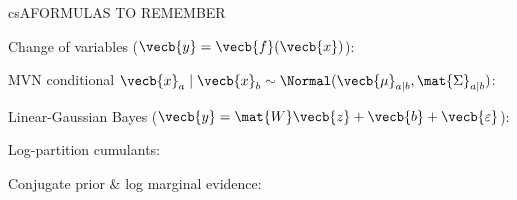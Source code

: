 \documentclass[../../../../master.tex]{subfiles}
\begin{document}
\begin{cscolumns}
\begin{cscard}{csA}{FORMULAS TO REMEMBER}
  \begin{csbul}
    \item Change of variables ($\vecb{y}=\vecb{f}(\vecb{x})$):
    \item MVN conditional $\vecb{x}_a\mid\vecb{x}_b \sim \Normal(\vecb{\mu}_{a\mid b},\mat{\Sigma}_{a\mid b})$:
    \item Linear-Gaussian Bayes ($\vecb{y}=\mat{W}\vecb{z}+\vecb{b}+\vecb{\varepsilon}$):
    \item Log-partition cumulants:
    \item Conjugate prior \& log marginal evidence:
  \end{csbul}
\end{cscard}


\end{cscolumns}
\end{document}
